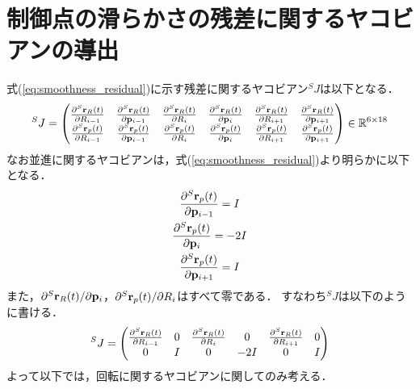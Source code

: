 \section{制御点の滑らかさの残差に関するヤコビアンの導出}
\label{sec:smoothness}

式(\ref{eq:smoothness_residual})に示す残差に関するヤコビアン${}^{S}J$は以下となる．
%
\begin{align}
  {}^{S}J = \left( \begin{matrix}
    \frac{ \partial {}^{S}{\bf r}_{R}(t) }{ \partial R_{i-1} } &
    \frac{ \partial {}^{S}{\bf r}_{R}(t) }{ \partial {\bf p}_{i-1} } &
    \frac{ \partial {}^{S}{\bf r}_{R}(t) }{ \partial R_{i} } &
    \frac{ \partial {}^{S}{\bf r}_{R}(t) }{ \partial {\bf p}_{i} } &
    \frac{ \partial {}^{S}{\bf r}_{R}(t) }{ \partial R_{i+1} } &
    \frac{ \partial {}^{S}{\bf r}_{R}(t) }{ \partial {\bf p}_{i+1} } \\
    \frac{ \partial {}^{S}{\bf r}_{p}(t) }{ \partial R_{i-1} } &
    \frac{ \partial {}^{S}{\bf r}_{p}(t) }{ \partial {\bf p}_{i-1} } &
    \frac{ \partial {}^{S}{\bf r}_{p}(t) }{ \partial R_{i} } &
    \frac{ \partial {}^{S}{\bf r}_{p}(t) }{ \partial {\bf p}_{i} } &
    \frac{ \partial {}^{S}{\bf r}_{p}(t) }{ \partial R_{i+1} } &
    \frac{ \partial {}^{S}{\bf r}_{p}(t) }{ \partial {\bf p}_{i+1} } 
  \end{matrix} \right) \in \mathbb{R}^{6 \times 18}
\end{align}
%
なお並進に関するヤコビアンは，式(\ref{eq:smoothness_residual})より明らかに以下となる．
%
\begin{align}
  \begin{gathered}
    \frac{ \partial {}^{S}{\bf r}_{p}(t) }{ \partial {\bf p}_{i-1} } = I    \\
    \frac{ \partial {}^{S}{\bf r}_{p}(t) }{ \partial {\bf p}_{i} }   = -2 I \\
    \frac{ \partial {}^{S}{\bf r}_{p}(t) }{ \partial {\bf p}_{i+1} } = I    \\
  \end{gathered}
\end{align}
%
また，$\partial {}^{S}{\bf r}_{R}(t) / \partial {\bf p}_{i}$，$\partial {}^{S}{\bf r}_{p}(t) / \partial R_{i}$はすべて零である．
すなわち${}^{S}J$は以下のように書ける．
%
\begin{align}
  {}^{S}J = \left( \begin{matrix}
    \frac{ \partial {}^{S}{\bf r}_{R}(t) }{ \partial R_{i-1} } &
    0 &
    \frac{ \partial {}^{S}{\bf r}_{R}(t) }{ \partial R_{i} } &
    0 &
    \frac{ \partial {}^{S}{\bf r}_{R}(t) }{ \partial R_{i+1} } &
    0 \\
    0 &
    I &
    0 &
    -2 I &
    0 &
    I 
  \end{matrix} \right)
\end{align}
%
よって以下では，回転に関するヤコビアンに関してのみ考える．

